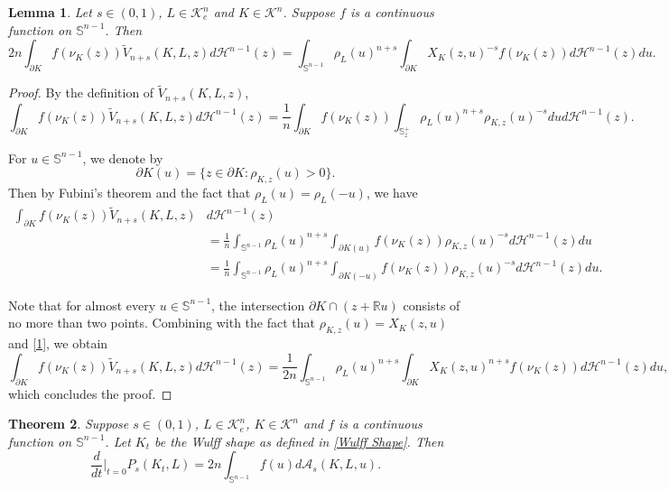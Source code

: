 \documentclass[12pt, oneside,reqno]{amsart}
\numberwithin{equation}{section}
\newtheorem{theorem}{Theorem}[section]
\newtheorem{lemma}[theorem]{Lemma}
\newtheorem{definition and theorem}[theorem]{Definition and Theorem}
\theoremstyle{plain}
\theoremstyle{remark}
\theoremstyle{definition}
\newcommand{\sn}{{\mathbb S}^{n-1}}
\newcommand{\tr}{\mathbb R}
\newcommand{\tk}{\mathcal{K}}
\newcommand{\tH}{\mathcal{H}}
\begin{document}
\begin{lemma}\label{id}
    Let $s\in(0,1)$, $L\in\tk_e^n$ and $K\in\tk^n$. Suppose $f$ is a continuous function on $\sn$. Then
    \[2n\int_{\partial K}f(\nu_K(z))\tilde{V}_{n+s}(K,L,z)d\tH^{n-1}(z)=\int_{\sn}\rho_L(u)^{n+s}\int_{\partial K}X_K(z,u)^{-s}f(\nu_K(z))d\tH^{n-1}(z)du.\]
\end{lemma}

\begin{proof}
    By the definition of $\tilde{V}_{n+s}(K,L,z)$,
    \[\int_{\partial K}f(\nu_K(z))\tilde{V}_{n+s}(K,L,z)d\tH^{n-1}(z)=\frac{1}{n}\int_{\partial K}f(\nu_K(z))\int_{\mathbb S_z^+}\rho_L(u)^{n+s}\rho_{K,z}(u)^{-s}dud\tH^{n-1}(z).\]
    
    For $u\in\sn$, we denote by
    \[\partial K(u)=\{z\in\partial K: \rho_{K,z}(u)>0\}.\]
    Then by Fubini's theorem and the fact that $\rho_L(u)=\rho_L(-u)$, we have
    \begin{equation}\label{1}
        \begin{aligned}
        \int_{\partial K}f(\nu_K(z))\tilde{V}_{n+s}(K,L,z)&d\tH^{n-1}(z)\\
        &=\frac{1}{n}\int_{\sn}\rho_L(u)^{n+s}\int_{\partial K(u)}f(\nu_K(z))\rho_{K,z}(u)^{-s}d\tH^{n-1}(z)du\\
        &=\frac{1}{n}\int_{\sn}\rho_L(u)^{n+s}\int_{\partial K(-u)}f(\nu_K(z))\rho_{K,z}(u)^{-s}d\tH^{n-1}(z)du.
        \end{aligned}
    \end{equation}

    Note that for almost every $u\in\sn$, the intersection $\partial K\cap (z+\tr u)$ consists of no more than two points. Combining with the fact that $\rho_{K,z}(u)=X_K(z,u)$ and \eqref{1}, we obtain
    \[\int_{\partial K}f(\nu_K(z))\tilde{V}_{n+s}(K,L,z)d\tH^{n-1}(z)=\frac{1}{2n}\int_{\sn}\rho_L(u)^{n+s}\int_{\partial K}X_K(z,u)^{n+s}f(\nu_K(z))d\tH^{n-1}(z)du,\]
    which concludes the proof.
\end{proof}

\begin{theorem}\label{var}
Suppose $s \in (0,1)$, $L \in \tk_e^n$, $K \in \tk^n$ and $f$ is a continuous function on $\sn$. Let $K_t$ be the Wulff shape  as defined  in \eqref{Wulff Shape}. Then 
    \[\frac{d}{dt}\Big|_{t=0}P_s(K_t,L)=2n\int_{\sn}f(u)d\mathcal{A}_s(K,L,u).\]
\end{theorem}
\end{document}
